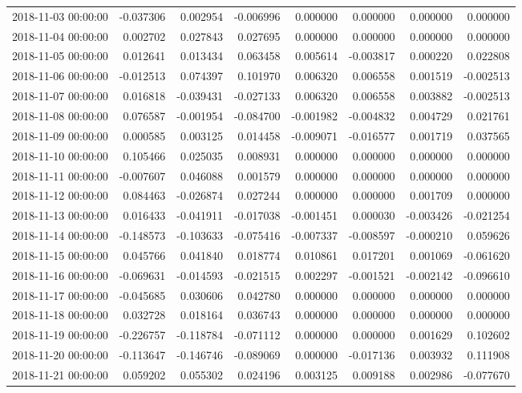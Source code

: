 \begin{tabular}{lrrrrrrr}
2018-11-03 00:00:00 & -0.037306 & 0.002954 & -0.006996 & 0.000000 & 0.000000 & 0.000000 & 0.000000 \\
2018-11-04 00:00:00 & 0.002702 & 0.027843 & 0.027695 & 0.000000 & 0.000000 & 0.000000 & 0.000000 \\
2018-11-05 00:00:00 & 0.012641 & 0.013434 & 0.063458 & 0.005614 & -0.003817 & 0.000220 & 0.022808 \\
2018-11-06 00:00:00 & -0.012513 & 0.074397 & 0.101970 & 0.006320 & 0.006558 & 0.001519 & -0.002513 \\
2018-11-07 00:00:00 & 0.016818 & -0.039431 & -0.027133 & 0.006320 & 0.006558 & 0.003882 & -0.002513 \\
2018-11-08 00:00:00 & 0.076587 & -0.001954 & -0.084700 & -0.001982 & -0.004832 & 0.004729 & 0.021761 \\
2018-11-09 00:00:00 & 0.000585 & 0.003125 & 0.014458 & -0.009071 & -0.016577 & 0.001719 & 0.037565 \\
2018-11-10 00:00:00 & 0.105466 & 0.025035 & 0.008931 & 0.000000 & 0.000000 & 0.000000 & 0.000000 \\
2018-11-11 00:00:00 & -0.007607 & 0.046088 & 0.001579 & 0.000000 & 0.000000 & 0.000000 & 0.000000 \\
2018-11-12 00:00:00 & 0.084463 & -0.026874 & 0.027244 & 0.000000 & 0.000000 & 0.001709 & 0.000000 \\
2018-11-13 00:00:00 & 0.016433 & -0.041911 & -0.017038 & -0.001451 & 0.000030 & -0.003426 & -0.021254 \\
2018-11-14 00:00:00 & -0.148573 & -0.103633 & -0.075416 & -0.007337 & -0.008597 & -0.000210 & 0.059626 \\
2018-11-15 00:00:00 & 0.045766 & 0.041840 & 0.018774 & 0.010861 & 0.017201 & 0.001069 & -0.061620 \\
2018-11-16 00:00:00 & -0.069631 & -0.014593 & -0.021515 & 0.002297 & -0.001521 & -0.002142 & -0.096610 \\
2018-11-17 00:00:00 & -0.045685 & 0.030606 & 0.042780 & 0.000000 & 0.000000 & 0.000000 & 0.000000 \\
2018-11-18 00:00:00 & 0.032728 & 0.018164 & 0.036743 & 0.000000 & 0.000000 & 0.000000 & 0.000000 \\
2018-11-19 00:00:00 & -0.226757 & -0.118784 & -0.071112 & 0.000000 & 0.000000 & 0.001629 & 0.102602 \\
2018-11-20 00:00:00 & -0.113647 & -0.146746 & -0.089069 & 0.000000 & -0.017136 & 0.003932 & 0.111908 \\
2018-11-21 00:00:00 & 0.059202 & 0.055302 & 0.024196 & 0.003125 & 0.009188 & 0.002986 & -0.077670 \\

\end{tabular}
